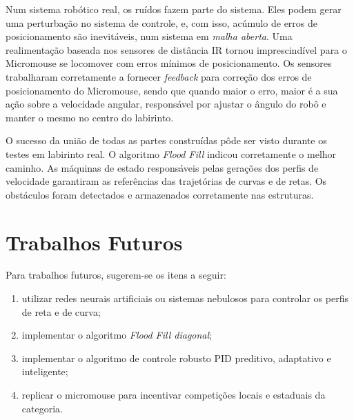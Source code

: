 Num sistema robótico real, os ruídos fazem parte do sistema. Eles podem gerar uma perturbação no sistema de controle, e, com isso, acúmulo de erros de posicionamento são inevitáveis, num sistema em \emph{malha aberta}. Uma realimentação baseada nos sensores de distância IR tornou imprescindível para o Micromouse se locomover com erros mínimos de posicionamento. Os sensores trabalharam corretamente a fornecer \emph{feedback} para correção dos erros de posicionamento do Micromouse, sendo que quando maior o erro, maior é a sua ação sobre a velocidade angular, responsável por ajustar o ângulo do robô e manter o mesmo no centro do labirinto.

O sucesso da união de todas as partes construídas pôde ser visto durante os testes em labirinto real. O algoritmo \emph{Flood Fill} indicou corretamente o melhor caminho. As máquinas de estado responsáveis pelas gerações dos perfis de velocidade garantiram as referências das trajetórias de curvas e de retas.  Os obstáculos foram detectados e armazenados corretamente nas estruturas.


\section{Trabalhos Futuros}
Para trabalhos futuros, sugerem-se os itens a seguir:

\begin{enumerate}[leftmargin=2cm,label=\alph*)]
	\item utilizar redes neurais artificiais ou sistemas nebulosos para controlar os perfis de reta e de curva;
	\item implementar o algoritmo \emph{Flood Fill diagonal};
	\item implementar o algoritmo de controle robusto PID preditivo, adaptativo e inteligente;
	\item replicar o micromouse para incentivar competições locais e estaduais da categoria.
\end{enumerate}
